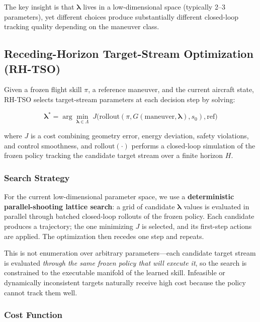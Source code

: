 \documentclass{article}
\begin{document}
The key insight is that $\bm{\lambda}$ lives in a low-dimensional space (typically 2--3 parameters), yet different choices produce substantially different closed-loop tracking quality depending on the maneuver class.

\subsection{Receding-Horizon Target-Stream Optimization (RH-TSO)}

Given a frozen flight skill $\pi$, a reference maneuver, and the current aircraft state, RH-TSO selects target-stream parameters at each decision step by solving:

\begin{equation}
  \bm{\lambda}^* = \arg\min_{\bm{\lambda} \in \Lambda} \; J\big(\text{rollout}(\pi, G(\text{maneuver}, \bm{\lambda}), s_0), \text{ref}\big)
\end{equation}

where $J$ is a cost combining geometry error, energy deviation, safety violations, and control smoothness, and $\text{rollout}(\cdot)$ performs a closed-loop simulation of the frozen policy tracking the candidate target stream over a finite horizon $H$.

\subsubsection{Search Strategy}

For the current low-dimensional parameter space, we use a \textbf{deterministic parallel-shooting lattice search}:
a grid of candidate $\bm{\lambda}$ values is evaluated in parallel through batched closed-loop rollouts of the frozen policy.
Each candidate produces a trajectory; the one minimizing $J$ is selected, and its first-step actions are applied.
The optimization then recedes one step and repeats.

This is not enumeration over arbitrary parameters---each candidate target stream is evaluated \emph{through the same frozen policy that will execute it}, so the search is constrained to the executable manifold of the learned skill.
Infeasible or dynamically inconsistent targets naturally receive high cost because the policy cannot track them well.

\subsubsection{Cost Function}
\end{document}
